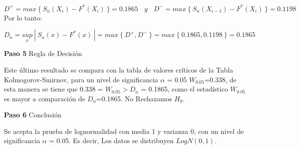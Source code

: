 \documentclass[
  a4paper,
  oneside,
  openany]{book}
\begin{document}
\[ D^+= max\ \{\ S_{n}(X_{i})-F^*(X_{i}) \ \}= 0.1865 \ \ \ \ y\ \ \ \ D^-= max\ \{\ S_{n}(X_{i-1})-F^*(X_{i})\ \}=0.1198\]
Por lo tanto:

\[D_{n}=\underset{x}{sup}\ | \ S_{n}(x)-F^*(x) \ |=max \ \{ \ D^+,D^- \ \}=max \ \{ \  0.1865,0.1198 \ \}=0.1865\]

\textbf{Paso 5} Regla de Decisión

Este último resultado se compara con la tabla de valores críticos de la Tabla Kolmogorov-Smirnov, para un nivel de significancia \(\alpha\) = 0.05
\(W_{0.05}\)=0.338, de esta manera se tiene que 0.338 = \(W_{0.05} > D_{n}\) = 0.1865, como el estadístico \(W_{0.05}\) es mayor a comparación de \(D_{n}\)=0.1865.
No Rechazamos \(H_0\).

\textbf{Paso 6} Conclusión

Se acepta la prueba de lognormalidad con media 1 y varianza 0, con un nivel de significancia \(\alpha\) = 0.05. Es decir, Los datos se distribuyen \(LogN(0,1)\).
\end{document}
